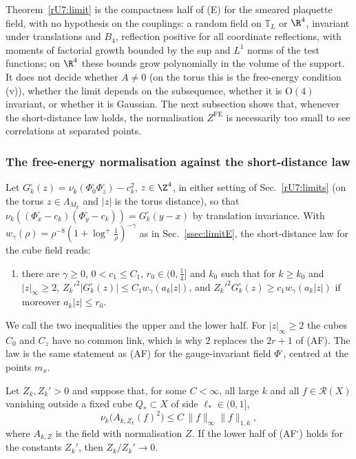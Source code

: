 \begin{remark}\label{rU7:limitremark}
Theorem~\ref{rU7:limit} is the compactness half of (E) for the smeared
plaquette field, with no hypothesis on the couplings: a random field on
$\mathbb T_L$ or $\R^4$, invariant under translations and $B_4$, reflection
positive for all coordinate reflections, with moments of factorial growth
bounded by the sup and $L^1$ norms of the test functions; on $\R^4$ these
bounds grow polynomially in the volume of the support. It does not decide
whether $A\ne0$ (on the torus this is the free-energy condition (v)), whether
the limit depends on the subsequence, whether it is $\mathrm O(4)$ invariant,
or whether it is Gaussian. The next subsection shows that, whenever the
short-distance law holds, the normalisation $Z^{\mathrm{FE}}$ is necessarily
too small to see correlations at separated points.
\end{remark}
\subsubsection{The free-energy normalisation against the short-distance law}
\label{rU7:af}

Let $G^\square_k(z)=\nu_k(\Phi^\square_0\Phi^\square_z)-c_k^2$, $z\in\Z^4$, in
either setting of Sec.~\ref{rU7:limits} (on the torus $z\in\Lambda_{M_k}$ and
$|z|$ is the torus distance), so that $\nu_k((\Phi^\square_x-c_k)(\Phi^\square
_y-c_k))=G^\square_k(y-x)$ by translation invariance. With $w_\gamma(\rho)=
\rho^{-8}(1+\log^+\frac1\rho)^{-\gamma}$ as in Sec.~\ref{ssec:limitE}, the
short-distance law for the cube field reads:
\begin{enumerate}[label=\textup{(AF$^\square$)},leftmargin=*]
\item there are $\gamma\ge0$, $0<c_1\le C_1$, $r_0\in(0,\frac14]$ and $k_0$
such that for $k\ge k_0$ and $|z|_\infty\ge2$,
$Z_k'^2|G^\square_k(z)|\le C_1w_\gamma(a_k|z|)$, and
$Z_k'^2G^\square_k(z)\ge c_1w_\gamma(a_k|z|)$ if moreover $a_k|z|\le r_0$.
\end{enumerate}
We call the two inequalities the upper and the lower half. For $|z|_\infty\ge
2$ the cubes $C_0$ and $C_z$ have no common link, which is why $2$ replaces
the $2r+1$ of (AF). The law is the same statement as (AF) for the
gauge-invariant field $\Phi^\square$, centred at the points $m_x$.

\begin{lemma}
\label{rU7:incompat}
Let $Z_k,Z_k'>0$ and suppose that, for some $C<\infty$, all large $k$ and all
$f\in\mathcal R(X)$ vanishing outside a fixed cube $Q_*\subset X$ of side
$\ell_*\in(0,1]$,
\[
\nu_k\bigl(A_{k,Z_k}(f)^2\bigr)\le C\,\|f\|_\infty\|f\|_{1,k},
\]
where $A_{k,Z}$ is the field with normalisation $Z$. If the lower half of
\textup{(AF$^\square$)} holds for the constants $Z_k'$, then $Z_k/Z_k'\to0$.
\end{lemma}

